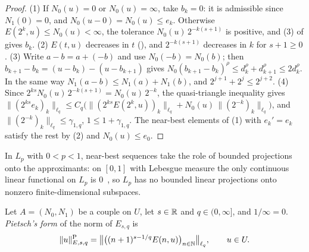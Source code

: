 \begin{proof}
\leanok
{}
(1) If $N_0(u) = 0$ or $N_0(u) = \infty$, take $b_k = 0$: it is admissible since $N_1(0) = 0$,
and $N_0(u - 0) = N_0(u) \leq e_k$. Otherwise $E(2^k, u) \leq N_0(u) < \infty$, the tolerance
$N_0(u) \, 2^{-k(s+1)}$ is positive, and (3) of  gives $b_k$.
(2) $E(t, u)$ decreases in $t$ (), and $2^{-k(s+1)}$ decreases in $k$ for
$s + 1 \geq 0$. (3) Write $a - b = a + (-b)$ and use $N_0(-b) = N_0(b)$; then
$b_{k+1} - b_k = (u - b_k) - (u - b_{k+1})$ gives
$N_0(b_{k+1} - b_k)^\rho \leq d_k^\rho + d_{k+1}^\rho \leq 2 d_k^\rho$. In the same way
$N_1(a - b) \leq N_1(a) + N_1(b)$, and $2^{j+1} + 2^j \leq 2^{j+2}$. (4) Since
$2^{ks} N_0(u) \, 2^{-k(s+1)} = N_0(u) \, 2^{-k}$, the quasi-triangle inequality gives
$\|(2^{ks} e_k)_k\|_{\ell_q} \leq C_q \bigl(\|(2^{ks} E(2^k, u))_k\|_{\ell_q} + N_0(u) \,
\|(2^{-k})_k\|_{\ell_q}\bigr)$, and $\|(2^{-k})_k\|_{\ell_q} \leq \gamma_{1, q}$, $1 \leq
1 + \gamma_{1, q}$. The near-best elements of (1) with $e_k' = e_k$ satisfy the rest by (2) and
$N_0(u) \leq e_0$.
\end{proof}

In $L_p$ with $0 < p < 1$, near-best sequences take the role of bounded projections onto the
approximants: on $[0, 1]$ with Lebesgue measure the only continuous linear functional on $L_p$
is $0$~\cite{Day1940}, so $L_p$ has no bounded linear projections onto nonzero
finite-dimensional subspaces.

\begin{definition}
\label{def:e-pietsch-norm}
\leanok
{}
Let $A = (N_0, N_1)$ be a couple on $U$, let $s \in \mathbb{R}$ and $q \in (0, \infty]$, and
$1/\infty = 0$. \emph{Pietsch's form} of the norm of $E_{s, q}$ is
\[
  \|u\|^{\mathrm{P}}_{E, s, q} = \bigl\| \bigl((n+1)^{s - 1/q} E(n, u)\bigr)_{n \in \mathbb{N}}
  \bigr\|_{\ell_q} , \qquad u \in U .
\]
\end{definition}

